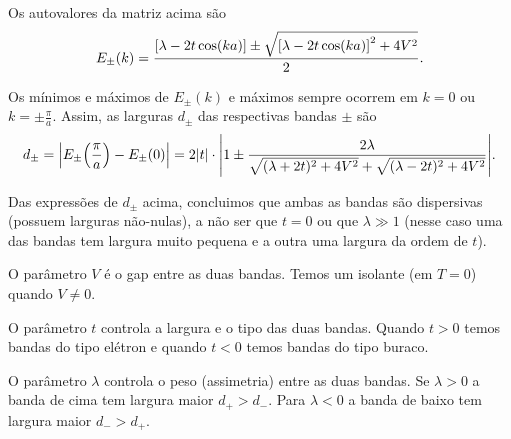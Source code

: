 \documentclass[a4paper,10pt]{article}
\begin{document}
Os autovalores da matriz acima são
$$
E_\pm(k) =
\frac{\qty[\lambda - 2t \cos(ka)] \pm
\sqrt{\qty[\lambda - 2t \cos(ka)]^2 + 4 V^2}}
{2}.
$$

Os mínimos e máximos de $E_{\pm}(k)$ e máximos sempre ocorrem em $k = 0$ ou $k = \pm \frac{\pi}{a}$. Assim, as larguras $d_\pm$ das respectivas bandas $\pm$ são
$$
d_\pm = \abs{E_\pm\qty(\frac{\pi}{a}) - E_\pm(0)} =
2\abs{t} \cdot \abs{1 \pm
\frac{2 \lambda}{\sqrt{(\lambda+2t)^2+4V^2}+\sqrt{(\lambda-2t)^2+4V^2}}}.
$$

Das expressões de $d_\pm$ acima, concluimos que ambas as bandas são dispersivas (possuem larguras não-nulas), a não ser que $t = 0$ ou que $\lambda \gg 1$ (nesse caso uma das bandas tem largura muito pequena e a outra uma largura da ordem de $t$).

\n

O parâmetro $V$ é o gap entre as duas bandas. Temos um isolante (em $T = 0$) quando $V \neq 0$.

O parâmetro $t$ controla a largura e o tipo das duas bandas. Quando $t > 0$ temos bandas do tipo elétron e quando $t < 0$ temos bandas do tipo buraco.

O parâmetro $\lambda$ controla o peso (assimetria) entre as duas bandas. Se $\lambda > 0$ a banda de cima tem largura maior $d_+ > d_-$. Para $\lambda < 0$ a banda de baixo tem largura maior $d_- > d_+$.
\end{document}
